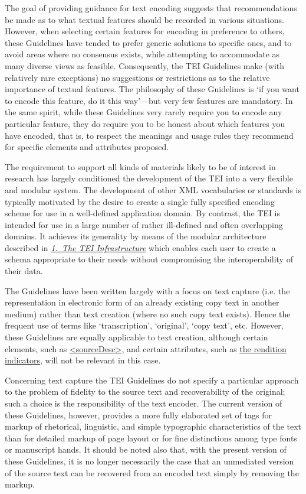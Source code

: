 The goal of providing guidance for text encoding suggests that recommendations be made as to what textual features should be recorded in various situations. However, when selecting certain features for encoding in preference to others, these Guidelines have tended to prefer generic solutions to specific ones, and to avoid areas where no consensus exists, while attempting to accommodate as many diverse views as feasible. Consequently, the TEI Guidelines make (with relatively rare exceptions) no suggestions or restrictions as to the relative importance of textual features. The philosophy of these Guidelines is ‘if you want to encode this feature, do it this way’—but very few features are mandatory. In the same spirit, while these Guidelines very rarely require you to encode any particular feature, they do require you to be honest about which features you have encoded, that is, to respect the meanings and usage rules they recommend for specific elements and attributes proposed.\par
The requirement to support all kinds of materials likely to be of interest in research has largely conditioned the development of the TEI into a very flexible and modular system. The development of other XML vocabularies or standards is typically motivated by the desire to create a single fully specified encoding scheme for use in a well-defined application domain. By contrast, the TEI is intended for use in a large number of rather ill-defined and often overlapping domains. It achieves its generality by means of the modular architecture described in \textit{\hyperref[ST]{1.\ The TEI Infrastructure}} which enables each user to create a schema appropriate to their needs without compromising the interoperability of their data.\par
The Guidelines have been written largely with a focus on text capture (i.e. the representation in electronic form of an already existing copy text in another medium) rather than text creation (where no such copy text exists). Hence the frequent use of terms like ‘transcription’, ‘original’, ‘copy text’, etc. However, these Guidelines are equally applicable to text creation, although certain elements, such as \hyperref[TEI.sourceDesc]{<sourceDesc>}, and certain attributes, such as \hyperref[STGAre]{the rendition indicators}, will not be relevant in this case.\par
Concerning text capture the TEI Guidelines do not specify a particular approach to the problem of fidelity to the source text and recoverability of the original; such a choice is the responsibility of the text encoder. The current version of these Guidelines, however, provides a more fully elaborated set of tags for markup of rhetorical, linguistic, and simple typographic characteristics of the text than for detailed markup of page layout or for fine distinctions among type fonts or manuscript hands. It should be noted also that, with the present version of these Guidelines, it is no longer necessarily the case that an unmediated version of the source text can be recovered from an encoded text simply by removing the markup. \par
